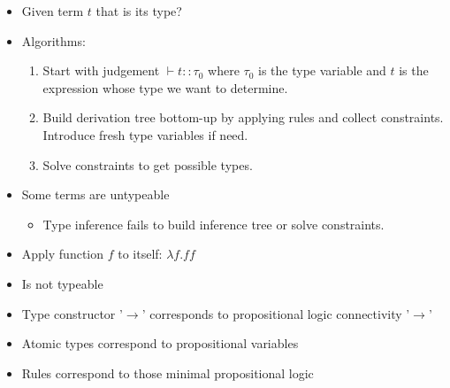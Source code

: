 \begin{itemize}
\begin{itemize}
            \item Given term $t$ that is its type?
            \item Algorithms:
                \begin{enumerate}
                    \item Start with judgement $\vdash t :: \tau_0$ where $\tau_0$ is the type variable and $t$ is the expression whose type we want to determine.
                    \item Build derivation tree bottom-up by applying rules and collect constraints. Introduce fresh type variables if need.
                    \item Solve constraints to get possible types.
                \end{enumerate}
            \item Some terms are untypeable
                \begin{itemize}
                    \item Type inference fails to build inference tree or solve constraints.
                \end{itemize}
        \end{itemize}
        \begin{itemize}
            \item Apply function $f$ to itself: $\lambda f. f f$
            \item Is not typeable
        \end{itemize}
        \begin{itemize}
            \item Type constructor '$\to$' corresponds to propositional logic connectivity '$\to$'
            \item Atomic types correspond to propositional variables
            \item Rules correspond to those minimal propositional logic
        \end{itemize}
\end{itemize}

